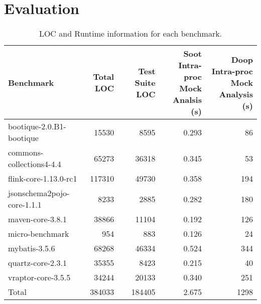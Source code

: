\section{Evaluation}
\label{sec:evaluation}

\begin{table*}
	\centering
	\caption{LOC and Runtime information for each benchmark.}
	\begin{tabular}{lrrrr}
		\toprule
		Benchmark & Total LOC & Test Suite LOC & \thead{Soot Intra-proc \\ Mock Analsis (s)}  & \thead{Doop Intra-proc \\ Mock Analysis (s)} \\
		\midrule
		bootique-2.0.B1-bootique           		&  15530   & 8595   &  0.293   & 86    \\
		commons-collections4-4.4           		&  65273   & 36318  &  0.345   & 53        \\
		flink-core-1.13.0-rc1           		&  117310  & 49730  &  0.358   & 194        \\
		jsonschema2pojo-core-1.1.1         		&  8233    & 2885   &  0.282   & 180       \\
		maven-core-3.8.1   		           		&  38866   & 11104  &  0.192   & 126        \\
		micro-benchmark         		  		&  954     & 883	&  0.126   & 24        \\
		mybatis-3.5.6         		  			&  68268   & 46334  &  0.524   & 344        \\
		quartz-core-2.3.1        	  			&  35355   & 8423   &  0.215   & 40      \\
		vraptor-core-3.5.5         	  			&  34244   & 20133  &  0.340   & 251      \\
		\bottomrule
		Total         	  						&  384033  & 184405 &  2.675   & 1298      \\
	\end{tabular}
	\label{tab:runtimes}
\end{table*}


